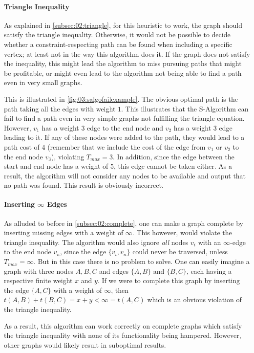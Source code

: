 \label{par:03:salgotriangle}
\paragraph{Triangle Inequality}
As explained in \cref{subsec:02:triangle}, for this heuristic to work, the graph should satisfy the triangle inequality.
Otherwise, it would not be possible to decide whether a constraint-respecting path can be found when including a specific vertex; at least not in the way this algorithm does it.
If the graph does not satisfy the inequality, this might lead the algorithm to miss pursuing paths that might be profitable,
or might even lead to the algorithm not being able to find a path even in very small graphs.

This is illustrated in \cref{fig:03:salgofailexample}. The obvious optimal path is the path taking all the edges with weight $1$. This illustrates that the S-Algorithm can fail to find a path even in very simple graphs not fulfilling the triangle equation.
However, $v_1$ has a weight $3$ edge to the end node and $v_2$ has a weight $3$ edge leading to it.
If any of these nodes were added to the path, they would lead to a path cost of $4$ (remember that we include the cost of the edge from $v_1$ or $v_2$ to the end node $v_3$), violating $T_{max} = 3$.
In addition, since the edge between the start and end node has a weight of $5$, this edge cannot be taken either.
As a result, the algorithm will not consider any nodes to be available and output that no path was found.
This result is obviously incorrect.

\paragraph{Inserting $\infty$ Edges}
As alluded to before in \cref{subsec:02:complete}, one can make a graph complete by inserting missing edges with a weight of $\infty$.
This however, would violate the triangle inequality.
The algorithm would also ignore \emph{all} nodes $v_i$ with an $\infty$-edge to the end node $v_n$, since the edge $\{v_i, v_n\}$ could never be traversed, unless $T_{max} = \infty$.
But in this case there is no problem to solve.
One can easily imagine a graph with three nodes $A, B, C$ and edges $\{A, B\}$ and $\{B, C\}$, each having a respective finite weight $x$ and $y$.
If we were to complete this graph by inserting the edge $\{A, C\}$ with a weight of $\infty$, then $t(A, B) + t(B,C) = x + y < \infty = t(A, C)$
which is an obvious violation of the triangle inequality.

As a result, this algorithm can work correctly on complete graphs which satisfy the triangle inequality with none of its functionality being hampered.
However, other graphs would likely result in suboptimal results.
